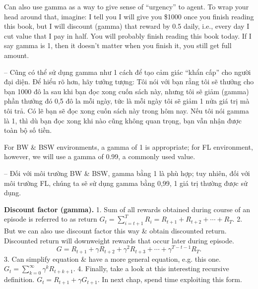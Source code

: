 \documentclass{article}
\begin{document}
\begin{itemize}
\begin{itemize}
        Can also use gamma as a way to give sense of ``urgency'' to agent. To wrap your head around that, imagine: I tell you I will give you \$1000 once you finish reading this book, but I will discount (gamma) that reward by 0.5 daily, i.e., every day I cut value that I pay in half. You will probably finish reading this book today. If I say gamma is 1, then it doesn't matter when you finish it, you still get full amount.

        -- Cũng có thể sử dụng gamma như 1 cách để tạo cảm giác ``khẩn cấp'' cho người đại diện. Để hiểu rõ hơn, hãy tưởng tượng: Tôi nói với bạn rằng tôi sẽ thưởng cho bạn 1000 đô la sau khi bạn đọc xong cuốn sách này, nhưng tôi sẽ giảm (gamma) phần thưởng đó 0,5 đô la mỗi ngày, tức là mỗi ngày tôi sẽ giảm 1 nửa giá trị mà tôi trả. Có lẽ bạn sẽ đọc xong cuốn sách này trong hôm nay. Nếu tôi nói gamma là 1, thì dù bạn đọc xong khi nào cũng không quan trọng, bạn vẫn nhận được toàn bộ số tiền.

        For BW \& BSW environments, a gamma of 1 is appropriate; for FL environment, however, we will use a gamma of 0.99, a commonly used value.

        -- Đối với môi trường BW \& BSW, gamma bằng 1 là phù hợp; tuy nhiên, đối với môi trường FL, chúng ta sẽ sử dụng gamma bằng 0,99, 1 giá trị thường được sử dụng.

        {\bf Discount factor (gamma).} 1. Sum of all rewards obtained during course of an episode is referred to as return $G_t = \sum_{i=t+1}^T R_i = R_{t+1} + R_{t+2} + \cdots + R_T$. 2. But we can also use discount factor this way \& obtain discounted return. Discounted return will downweight rewards that occur later during episode.
        \begin{equation*}
            G = R_{t+1} + \gamma R_{t+2} + \gamma^2R_{t+3} + \cdots + \gamma^{T - t - 1}R_T.
        \end{equation*}
        3. Can simplify equation \& have a more general equation, e.g. this one. $G_t = \sum_{k=0}^\infty \gamma^kR_{t + k + 1}$. 4. Finally, take a look at this interesting recursive definition. $G_t = R_{t+1} + \gamma G_{t+1}$. In next chap, spend time exploiting this form.


\end{itemize}
\end{itemize}
\end{document}
